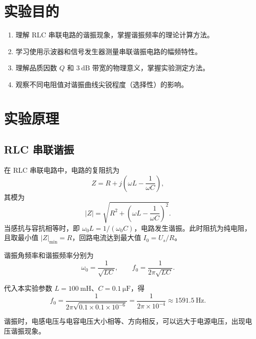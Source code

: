 \section{实验目的}

\begin{enumerate}[label=\arabic*.]
    \item 理解 RLC 串联电路的谐振现象，掌握谐振频率的理论计算方法。
    \item 学习使用示波器和信号发生器测量串联谐振电路的幅频特性。
    \item 理解品质因数 \(Q\) 和 \(\SI{3}{\dB}\) 带宽的物理意义，掌握实验测定方法。
    \item 观察不同电阻值对谐振曲线尖锐程度（选择性）的影响。
\end{enumerate}

\section{实验原理}

\subsection{RLC 串联谐振}

在 RLC 串联电路中，电路的复阻抗为
\begin{equation}
    Z = R + j\!\left(\omega L - \frac{1}{\omega C}\right),
\end{equation}
其模为
\begin{equation}
    |Z| = \sqrt{R^{2}+\left(\omega L - \dfrac{1}{\omega C}\right)^{2}}.
\end{equation}
当感抗与容抗相等时，即 \(\omega_{0}L = 1/(\omega_{0}C)\)，电路发生谐振。此时阻抗为纯电阻，且取最小值 \(|Z|_{\min}=R\)，回路电流达到最大值 \(I_{0}=U_{s}/R\)。

谐振角频率和谐振频率分别为
\begin{equation}
    \omega_{0}=\frac{1}{\sqrt{LC}}, \qquad
    f_{0}=\frac{1}{2\pi\sqrt{LC}}.
\end{equation}

代入本实验参数 \(L=\SI{100}{\milli\henry}\)、\(C=\SI{0.1}{\micro\farad}\)，得
\begin{equation}
    f_{0}=\frac{1}{2\pi\sqrt{0.1\times 0.1\times 10^{-6}}}
         =\frac{1}{2\pi\times 10^{-4}}
         \approx \SI{1591.5}{\hertz}.
\end{equation}

谐振时，电感电压与电容电压大小相等、方向相反，可以远大于电源电压，出现电压谐振现象。

